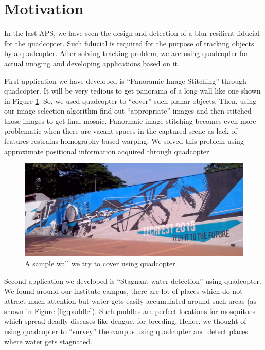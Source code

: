 \documentclass[11pt]{article}
\def\baselinestretch{1.15}
\begin{document}
\newpage

\section{Motivation}
In the last APS, we have seen the design and detection of a blur resilient
fiducial for the quadcopter. Such fiducial is required for the purpose of
tracking objects by a quadcopter. After solving tracking problem, we are using
quadcopter for actual imaging and developing applications based on it.

First application we have developed is ``Panoramic Image Stitching'' through
quadcopter. It will be very tedious to get panorama of a long wall like one
shown in Figure \ref{fig:wall}. So, we used quadcopter to ``cover'' such planar
objects.
Then, using our image selection algorithm find out ``appropriate'' images and then
stitched those images to get final mosaic. Panormaic image stitching
becomes even more problematic when there are vacant spaces in the captured
scene as lack of features restrains homography based warping. We solved this
problem using approximate positional information acquired through quadcopter.

\begin{figure}
 \centering
  \includegraphics[width=\linewidth]{IMG_20150415_155624.jpg}
  \caption{A sample wall we try to cover using quadcopter.}
  \label{fig:wall}
\end{figure}

Second application we developed is ``Stagnant water detection'' using
quadcopter. We found around our institute campus, there are lot of places
which do not attract much attention but water gets easily accumulated around
such areas (as shown in Figure \ref{fig:puddle}). Such puddles are perfect
locations for mosquitoes which spread deadly diseases like dengue, for breeding.
Hence, we thought of using quadcopter to ``survey'' the campus using quadcopter
and detect places where water gets stagnated.
\end{document}
